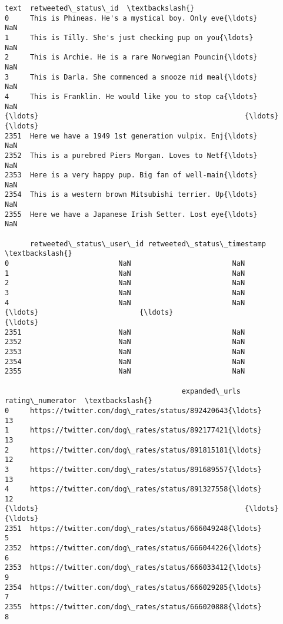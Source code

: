 \documentclass[11pt]{article}
\begin{document}
\begin{tcolorbox}[breakable, size=fbox, boxrule=.5pt, pad at break*=1mm, opacityfill=0]
\begin{Verbatim}[commandchars=\\\{\}]
                                                   text  retweeted\_status\_id  \textbackslash{}
0     This is Phineas. He's a mystical boy. Only eve{\ldots}                  NaN
1     This is Tilly. She's just checking pup on you{\ldots}                  NaN
2     This is Archie. He is a rare Norwegian Pouncin{\ldots}                  NaN
3     This is Darla. She commenced a snooze mid meal{\ldots}                  NaN
4     This is Franklin. He would like you to stop ca{\ldots}                  NaN
{\ldots}                                                 {\ldots}                  {\ldots}
2351  Here we have a 1949 1st generation vulpix. Enj{\ldots}                  NaN
2352  This is a purebred Piers Morgan. Loves to Netf{\ldots}                  NaN
2353  Here is a very happy pup. Big fan of well-main{\ldots}                  NaN
2354  This is a western brown Mitsubishi terrier. Up{\ldots}                  NaN
2355  Here we have a Japanese Irish Setter. Lost eye{\ldots}                  NaN

      retweeted\_status\_user\_id retweeted\_status\_timestamp  \textbackslash{}
0                          NaN                        NaN
1                          NaN                        NaN
2                          NaN                        NaN
3                          NaN                        NaN
4                          NaN                        NaN
{\ldots}                        {\ldots}                        {\ldots}
2351                       NaN                        NaN
2352                       NaN                        NaN
2353                       NaN                        NaN
2354                       NaN                        NaN
2355                       NaN                        NaN

                                          expanded\_urls  rating\_numerator  \textbackslash{}
0     https://twitter.com/dog\_rates/status/892420643{\ldots}                13
1     https://twitter.com/dog\_rates/status/892177421{\ldots}                13
2     https://twitter.com/dog\_rates/status/891815181{\ldots}                12
3     https://twitter.com/dog\_rates/status/891689557{\ldots}                13
4     https://twitter.com/dog\_rates/status/891327558{\ldots}                12
{\ldots}                                                 {\ldots}               {\ldots}
2351  https://twitter.com/dog\_rates/status/666049248{\ldots}                 5
2352  https://twitter.com/dog\_rates/status/666044226{\ldots}                 6
2353  https://twitter.com/dog\_rates/status/666033412{\ldots}                 9
2354  https://twitter.com/dog\_rates/status/666029285{\ldots}                 7
2355  https://twitter.com/dog\_rates/status/666020888{\ldots}                 8


\end{Verbatim}
\end{tcolorbox}
\end{document}
